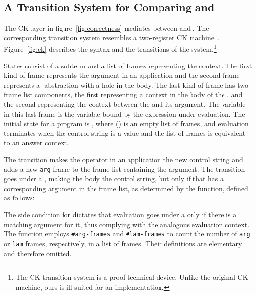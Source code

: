 \documentclass[runningheads,a4paper]{llncs}
\begin{document}
\subsection{A Transition System for Comparing \lneed and \lstep} \label{subsec:ck}

The CK layer in figure~\ref{fig:correctness} mediates between \lstep and
 \lneed. The corresponding transition system resembles a two-register CK 
 machine~\cite{Felleisen2009Redex}. Figure~\ref{fig:ck}
 describes the syntax and the transitions of the system.\footnote{The CK
 transition system is a proof-technical device. Unlike the original CK
 machine, ours is ill-suited for an implementation.}
\begin{figure*}[htbp]




\caption{A transition system for comparing \lneed and \lstep.}  \label{fig:ck}
\end{figure*}

States consist of a subterm and a list of frames representing the context. The
 first kind of frame represents the argument in an application and the second
 frame represents a -abstraction with a hole in the body. The last
 kind of frame has two frame list components, the first representing a context
 in the body of the , and the second representing the context between
 the  and its argument. The variable in this last frame is the
 variable bound by the  expression under evaluation. The initial state
 for a program  is , where () is an empty list of frames, and
 evaluation terminates when the control string is a value and the list of
 frames is equivalent to an answer context.

The \pushargck transition makes the operator in an application the new control
 string and adds a new \texttt{arg} frame to the frame list containing the
 argument. The \descendlamck transition goes under a , making the body
 the control string, but only if that  has a corresponding argument in
 the frame list, as determined by the \balancename function, defined as follows:

 The \balancename side condition for \descendlamck dictates that evaluation
 goes under a  only if there is a matching argument for it, thus
 complying with the analogous evaluation context. The \balancename function
 employs \texttt{\#arg-frames} and \texttt{\#lam-frames} to count the number of \texttt{arg} or
 \texttt{lam} frames, respectively, in a list of frames. Their definitions are
 elementary and therefore omitted.
\end{document}
